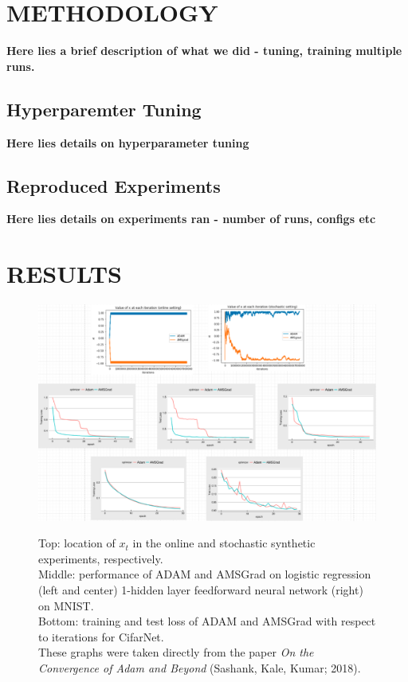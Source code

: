 \documentclass[letterpaper, 10 pt, conference]{ieeeconf}  %
\begin{document}
\section{METHODOLOGY}

\textbf{Here lies a brief description of what we did - tuning, training multiple runs.}

\subsection{Hyperparemter Tuning}

\textbf{Here lies details on hyperparameter tuning}

\subsection{Reproduced Experiments}

\textbf{Here lies details on experiments ran - number of runs, configs etc}

\section{RESULTS}

\begin{figure}
\begin{minipage}{1\textwidth}
  \centering
  \includegraphics[width=1\linewidth]{Our_Results.png}
  \label{fig:test2}
\end{minipage}%
\caption[]{Top: location of $x_t$ in the online and stochastic synthetic experiments, respectively. \\
Middle: performance of ADAM and AMSGrad on logistic regression (left and center) 1-hidden layer feedforward neural network (right) on MNIST.\\
Bottom: training and test loss of ADAM and AMSGrad with respect to iterations for CifarNet.\\
These graphs were taken directly from the paper \emph{On the Convergence of Adam and Beyond} (Sashank, Kale, Kumar; 2018).} 
\end{figure}  
\end{document}
